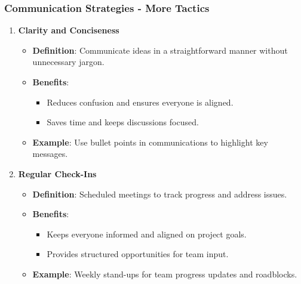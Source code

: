 \documentclass[aspectratio=169]{beamer}
\begin{document}
\begin{frame}[fragile]
    \frametitle{Communication Strategies - More Tactics}
    \begin{enumerate}[resume]
        \item \textbf{Clarity and Conciseness}
            \begin{itemize}
                \item \textbf{Definition}: Communicate ideas in a straightforward manner without unnecessary jargon.
                \item \textbf{Benefits}:
                    \begin{itemize}
                        \item Reduces confusion and ensures everyone is aligned.
                        \item Saves time and keeps discussions focused.
                    \end{itemize}
                \item \textbf{Example}: Use bullet points in communications to highlight key messages.
            \end{itemize}

        \item \textbf{Regular Check-Ins}
            \begin{itemize}
                \item \textbf{Definition}: Scheduled meetings to track progress and address issues.
                \item \textbf{Benefits}:
                    \begin{itemize}
                        \item Keeps everyone informed and aligned on project goals.
                        \item Provides structured opportunities for team input.
                    \end{itemize}
                \item \textbf{Example}: Weekly stand-ups for team progress updates and roadblocks.
            \end{itemize}
    \end{enumerate}
\end{frame}
\end{document}
